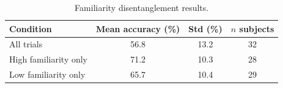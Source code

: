 \begin{table}[H]
  \centering
  \caption{Familiarity disentanglement results.}
  \label{tab:familiarity}
  \begin{tabular}{lccc}
    \toprule
    Condition & Mean accuracy (\%) & Std (\%) & $n$ subjects \\
    \midrule
    All trials & 56.8 & 13.2 & 32 \\
    High familiarity only & 71.2 & 10.3 & 28 \\
    Low familiarity only & 65.7 & 10.4 & 29 \\
    \bottomrule
  \end{tabular}
\end{table}
